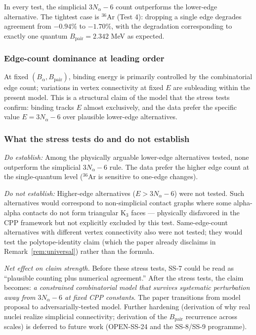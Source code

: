 \documentclass[11pt,letterpaper]{article}
\newcommand{\Bpair}{B_{\mathrm{pair}}}
\newcommand{\Balpha}{B_{\alpha}}
\newcommand{\Nalpha}{N_{\alpha}}
\begin{document}
In every test, the simplicial $3\Nalpha - 6$ count outperforms the lower-edge alternative. The tightest case is ${}^{36}$Ar (Test 4): dropping a single edge degrades agreement from $-0.94\%$ to $-1.70\%$, with the degradation corresponding to exactly one quantum $\Bpair = 2.342$ MeV as expected.

\subsubsection{Edge-count dominance at leading order}

At fixed $(\Balpha, \Bpair)$, binding energy is primarily controlled by the combinatorial edge count; variations in vertex connectivity at fixed $E$ are subleading within the present model. This is a structural claim of the model that the stress tests confirm: binding tracks $E$ almost exclusively, and the data prefer the specific value $E = 3\Nalpha - 6$ over plausible lower-edge alternatives.

\subsubsection{What the stress tests do and do not establish}

\emph{Do establish:} Among the physically arguable lower-edge alternatives tested, none outperform the simplicial $3\Nalpha - 6$ rule. The data prefer the higher edge count at the single-quantum level (${}^{36}$Ar is sensitive to one-edge changes).

\emph{Do not establish:} Higher-edge alternatives ($E > 3\Nalpha - 6$) were not tested. Such alternatives would correspond to non-simplicial contact graphs where some alpha-alpha contacts do not form triangular K$_3$ faces --- physically disfavored in the CPP framework but not explicitly excluded by this test. Same-edge-count alternatives with different vertex connectivity also were not tested; they would test the polytope-identity claim (which the paper already disclaims in Remark~\ref{rem:universal}) rather than the formula.

\emph{Net effect on claim strength.} Before these stress tests, SS-7 could be read as ``plausible counting plus numerical agreement.'' After the stress tests, the claim becomes: \emph{a constrained combinatorial model that survives systematic perturbation away from $3\Nalpha - 6$ at fixed CPP constants}. The paper transitions from model proposal to adversarially-tested model. Further hardening (derivation of why real nuclei realize simplicial connectivity; derivation of the $\Bpair$ recurrence across scales) is deferred to future work (OPEN-SS-24 and the SS-8/SS-9 programme).
\end{document}
